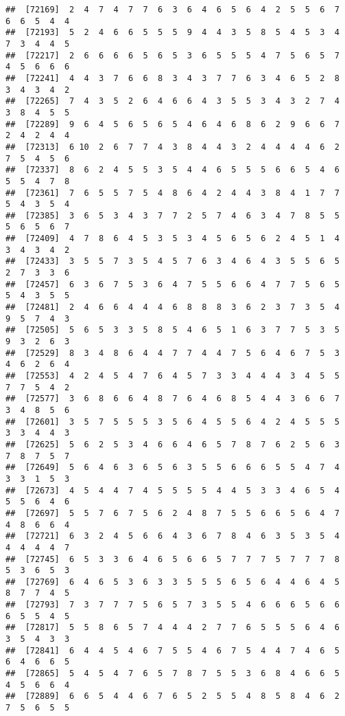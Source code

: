 \documentclass[
]{book}
\begin{document}
\begin{verbatim}
##  [72169]  2  4  7  4  7  7  6  3  6  4  6  5  6  4  2  5  5  6  7  6  6  5  4  4
##  [72193]  5  2  4  6  6  5  5  5  9  4  4  3  5  8  5  4  5  3  4  7  3  4  4  5
##  [72217]  2  6  6  6  6  5  6  5  3  6  5  5  5  4  7  5  6  5  7  4  5  6  6  6
##  [72241]  4  4  3  7  6  6  8  3  4  3  7  7  6  3  4  6  5  2  8  3  4  3  4  2
##  [72265]  7  4  3  5  2  6  4  6  6  4  3  5  5  3  4  3  2  7  4  3  8  4  5  5
##  [72289]  9  6  4  5  6  5  6  5  4  6  4  6  8  6  2  9  6  6  7  2  4  2  4  4
##  [72313]  6 10  2  6  7  7  4  3  8  4  4  3  2  4  4  4  4  6  2  7  5  4  5  6
##  [72337]  8  6  2  4  5  5  3  5  4  4  6  5  5  5  6  6  5  4  6  5  5  4  7  8
##  [72361]  7  6  5  5  7  5  4  8  6  4  2  4  4  3  8  4  1  7  7  5  4  3  5  4
##  [72385]  3  6  5  3  4  3  7  7  2  5  7  4  6  3  4  7  8  5  5  5  6  5  6  7
##  [72409]  4  7  8  6  4  5  3  5  3  4  5  6  5  6  2  4  5  1  4  3  4  3  4  2
##  [72433]  3  5  5  7  3  5  4  5  7  6  3  4  6  4  3  5  5  6  5  2  7  3  3  6
##  [72457]  6  3  6  7  5  3  6  4  7  5  5  6  6  4  7  7  5  6  5  5  4  3  5  5
##  [72481]  2  4  6  6  4  4  4  6  8  8  8  3  6  2  3  7  3  5  4  9  5  7  4  3
##  [72505]  5  6  5  3  3  5  8  5  4  6  5  1  6  3  7  7  5  3  5  9  3  2  6  3
##  [72529]  8  3  4  8  6  4  4  7  7  4  4  7  5  6  4  6  7  5  3  4  6  2  6  4
##  [72553]  4  2  4  5  4  7  6  4  5  7  3  3  4  4  4  3  4  5  5  7  7  5  4  2
##  [72577]  3  6  8  6  6  4  8  7  6  4  6  8  5  4  4  3  6  6  7  3  4  8  5  6
##  [72601]  3  5  7  5  5  5  3  5  6  4  5  5  6  4  2  4  5  5  5  3  3  4  4  3
##  [72625]  5  6  2  5  3  4  6  6  4  6  5  7  8  7  6  2  5  6  3  7  8  7  5  7
##  [72649]  5  6  4  6  3  6  5  6  3  5  5  6  6  6  5  5  4  7  4  3  3  1  5  3
##  [72673]  4  5  4  4  7  4  5  5  5  5  4  4  5  3  3  4  6  5  4  5  5  6  4  6
##  [72697]  5  5  7  6  7  5  6  2  4  8  7  5  5  6  6  5  6  4  7  4  8  6  6  4
##  [72721]  6  3  2  4  5  6  6  4  3  6  7  8  4  6  3  5  3  5  4  4  4  4  4  7
##  [72745]  6  5  3  3  6  4  6  5  6  6  5  7  7  7  5  7  7  7  8  5  3  6  5  3
##  [72769]  6  4  6  5  3  6  3  3  5  5  5  6  5  6  4  4  6  4  5  8  7  7  4  5
##  [72793]  7  3  7  7  7  5  6  5  7  3  5  5  4  6  6  6  5  6  6  6  5  5  4  5
##  [72817]  5  5  8  6  5  7  4  4  4  2  7  7  6  5  5  5  6  4  6  3  5  4  3  3
##  [72841]  6  4  4  5  4  6  7  5  5  4  6  7  5  4  4  7  4  6  5  6  4  6  6  5
##  [72865]  5  4  5  4  7  6  5  7  8  7  5  5  3  6  8  4  6  6  5  4  5  6  6  4
##  [72889]  6  6  5  4  4  6  7  6  5  2  5  5  4  8  5  8  4  6  2  7  5  6  5  5

\end{verbatim}
\end{document}
